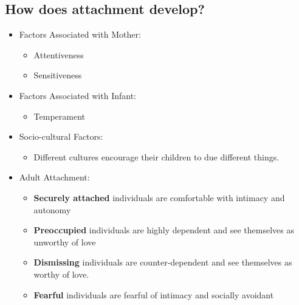 \documentclass[10pt,letter]{article}
\theoremstyle{plain}
\theoremstyle{definition}
\begin{document}
\subsection*{How does attachment develop?}
\begin{itemize}
    \item Factors Associated with Mother: \begin{itemize}
        \item Attentiveness
        \item Sensitiveness
    \end{itemize}
    \item Factors Associated with Infant: \begin{itemize}
        \item Temperament 
    \end{itemize}
    \item Socio-cultural Factors: \begin{itemize}
        \item Different cultures encourage their children to due different things. 
    \end{itemize}
    \item Adult Attachment: \begin{itemize}
        \item \textbf{Securely attached} individuals are comfortable with intimacy and autonomy
        \item \textbf{Preoccupied} individuals are highly dependent and see themselves as unworthy of love 
        \item \textbf{Dismissing} individuals are counter-dependent and see themselves as worthy of love. 
        \item \textbf{Fearful} individuals are fearful of intimacy and socially avoidant
    \end{itemize}
\end{itemize}
\end{document}
